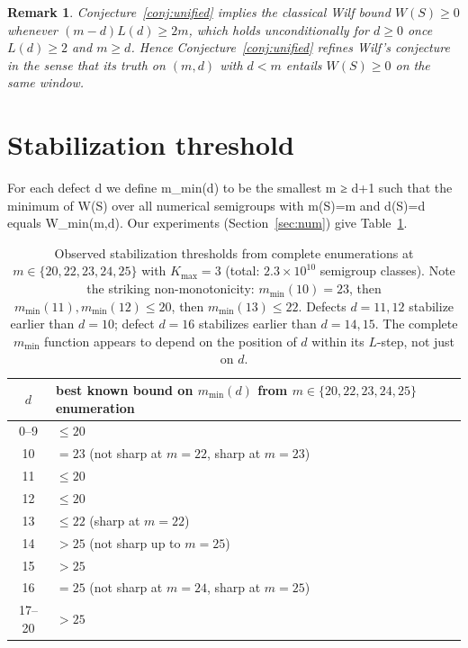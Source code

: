 \documentclass[11pt,a4paper]{article}
\newtheorem{remark}[theorem]{Remark}
\begin{document}
\begin{remark}
Conjecture~\ref{conj:unified} implies the classical Wilf bound
$W(S) \ge 0$ whenever $(m-d) L(d) \ge 2m$, which holds
unconditionally for $d \ge 0$ once $L(d) \ge 2$ and $m \ge d$.
Hence Conjecture~\ref{conj:unified} refines Wilf's conjecture in the
sense that its truth on $(m,d)$ with $d < m$ entails
$W(S) \ge 0$ on the same window.
\end{remark}

\section{Stabilization threshold}

For each defect d we define m\_min(d) to be the smallest m ≥ d+1
such that the minimum of W(S) over all numerical semigroups with
m(S)=m and d(S)=d equals W\_min(m,d).
Our experiments (Section~\ref{sec:num}) give Table~\ref{tab:mmin}.

\begin{table}[h]
\centering
\small
\begin{tabular}{c|l}
\toprule
$d$ & best known bound on $m_{\min}(d)$ from $m \in \{20,22,23,24,25\}$ enumeration\\
\midrule
0--9  & $\le 20$ \\
10    & $= 23$ (not sharp at $m=22$, sharp at $m=23$)\\
11    & $\le 20$ \\
12    & $\le 20$ \\
13    & $\le 22$ (sharp at $m=22$)\\
14    & $> 25$ (not sharp up to $m=25$)\\
15    & $> 25$ \\
16    & $= 25$ (not sharp at $m=24$, sharp at $m=25$)\\
17--20 & $> 25$ \\
\bottomrule
\end{tabular}
\caption{Observed stabilization thresholds from complete enumerations
at $m \in \{20,22,23,24,25\}$ with $K_{\max}=3$ (total: $2.3 \times
10^{10}$ semigroup classes). Note the striking non-monotonicity:
$m_{\min}(10)=23$, then $m_{\min}(11),m_{\min}(12) \le 20$, then
$m_{\min}(13) \le 22$. Defects $d=11,12$ stabilize earlier than
$d=10$; defect $d=16$ stabilizes earlier than $d=14,15$. The
complete $m_{\min}$ function appears to depend on the position of
$d$ within its $L$-step, not just on $d$.}
\label{tab:mmin}
\end{table}
\end{document}

